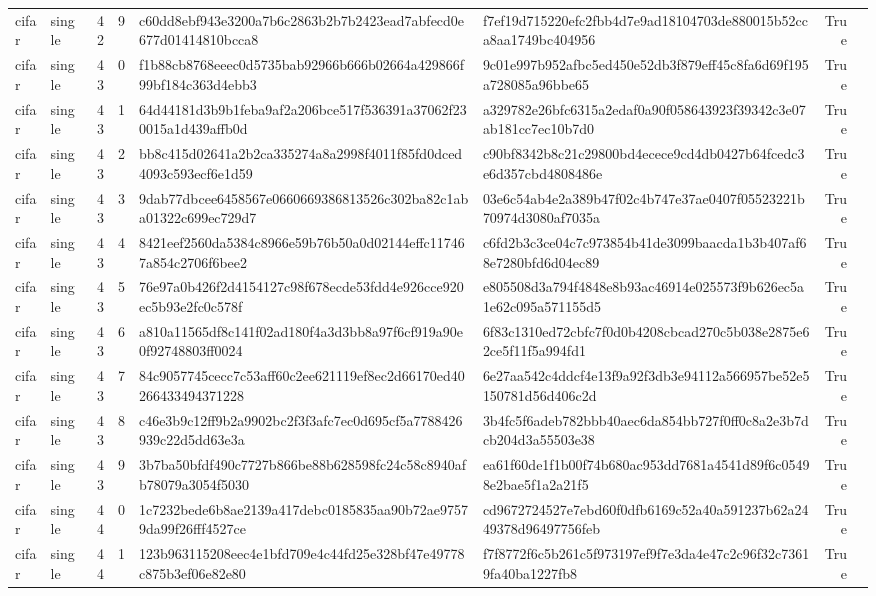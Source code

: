 \begin{tabular}{llrrllrl}
cifar & single & 42 & 9 & c60dd8ebf943e3200a7b6c2863b2b7b2423ead7abfecd0e677d01414810bcca8 & f7ef19d715220efc2fbb4d7e9ad18104703de880015b52cca8aa1749bc404956 & True &  \\
cifar & single & 43 & 0 & f1b88cb8768eeec0d5735bab92966b666b02664a429866f99bf184c363d4ebb3 & 9c01e997b952afbc5ed450e52db3f879eff45c8fa6d69f195a728085a96bbe65 & True &  \\
cifar & single & 43 & 1 & 64d44181d3b9b1feba9af2a206bce517f536391a37062f230015a1d439affb0d & a329782e26bfc6315a2edaf0a90f058643923f39342c3e07ab181cc7ec10b7d0 & True &  \\
cifar & single & 43 & 2 & bb8c415d02641a2b2ca335274a8a2998f4011f85fd0dced4093c593ecf6e1d59 & c90bf8342b8c21c29800bd4ecece9cd4db0427b64fcedc3e6d357cbd4808486e & True &  \\
cifar & single & 43 & 3 & 9dab77dbcee6458567e0660669386813526c302ba82c1aba01322c699ec729d7 & 03e6c54ab4e2a389b47f02c4b747e37ae0407f05523221b70974d3080af7035a & True &  \\
cifar & single & 43 & 4 & 8421eef2560da5384c8966e59b76b50a0d02144effc117467a854c2706f6bee2 & c6fd2b3c3ce04c7c973854b41de3099baacda1b3b407af68e7280bfd6d04ec89 & True &  \\
cifar & single & 43 & 5 & 76e97a0b426f2d4154127c98f678ecde53fdd4e926cce920ec5b93e2fc0c578f & e805508d3a794f4848e8b93ac46914e025573f9b626ec5a1e62c095a571155d5 & True &  \\
cifar & single & 43 & 6 & a810a11565df8c141f02ad180f4a3d3bb8a97f6cf919a90e0f92748803ff0024 & 6f83c1310ed72cbfc7f0d0b4208cbcad270c5b038e2875e62ce5f11f5a994fd1 & True &  \\
cifar & single & 43 & 7 & 84c9057745cecc7c53aff60c2ee621119ef8ec2d66170ed40266433494371228 & 6e27aa542c4ddcf4e13f9a92f3db3e94112a566957be52e5150781d56d406c2d & True &  \\
cifar & single & 43 & 8 & c46e3b9c12ff9b2a9902bc2f3f3afc7ec0d695cf5a7788426939c22d5dd63e3a & 3b4fc5f6adeb782bbb40aec6da854bb727f0ff0c8a2e3b7dcb204d3a55503e38 & True &  \\
cifar & single & 43 & 9 & 3b7ba50bfdf490c7727b866be88b628598fc24c58c8940afb78079a3054f5030 & ea61f60de1f1b00f74b680ac953dd7681a4541d89f6c05498e2bae5f1a2a21f5 & True &  \\
cifar & single & 44 & 0 & 1c7232bede6b8ae2139a417debc0185835aa90b72ae97579da99f26fff4527ce & cd9672724527e7ebd60f0dfb6169c52a40a591237b62a2449378d96497756feb & True &  \\
cifar & single & 44 & 1 & 123b963115208eec4e1bfd709e4c44fd25e328bf47e49778c875b3ef06e82e80 & f7f8772f6c5b261c5f973197ef9f7e3da4e47c2c96f32c73619fa40ba1227fb8 & True &  \\

\end{tabular}
